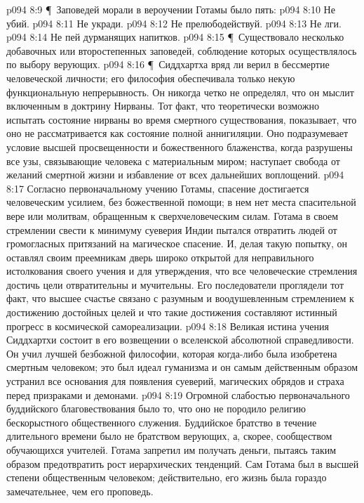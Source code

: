 \vs p094 8:9 \P\ Заповедей морали в вероучении Готамы было пять:
\vs p094 8:10 \bibnobreakspace Не убий.
\vs p094 8:11 \bibnobreakspace Не укради.
\vs p094 8:12 \bibnobreakspace Не прелюбодействуй.
\vs p094 8:13 \bibnobreakspace Не лги.
\vs p094 8:14 \bibnobreakspace Не пей дурманящих напитков.
\vs p094 8:15 \P\ Существовало несколько добавочных или второстепенных заповедей, соблюдение которых осуществлялось по выбору верующих.
\vs p094 8:16 \P\ Сиддхартха вряд ли верил в бессмертие человеческой личности; его философия обеспечивала только некую функциональную непрерывность. Он никогда четко не определял, что он мыслит включенным в доктрину Нирваны. Тот факт, что теоретически возможно испытать состояние нирваны во время смертного существования, показывает, что оно не рассматривается как состояние полной аннигиляции. Оно подразумевает условие высшей просвещенности и божественного блаженства, когда разрушены все узы, связывающие человека с материальным миром; наступает свобода от желаний смертной жизни и избавление от всех дальнейших воплощений.
\vs p094 8:17 Согласно первоначальному учению Готамы, спасение достигается человеческим усилием, без божественной помощи; в нем нет места спасительной вере или молитвам, обращенным к сверхчеловеческим силам. Готама в своем стремлении свести к минимуму суеверия Индии пытался отвратить людей от громогласных притязаний на магическое спасение. И, делая такую попытку, он оставлял своим преемникам дверь широко открытой для неправильного истолкования своего учения и для утверждения, что все человеческие стремления достичь цели отвратительны и мучительны. Его последователи проглядели тот факт, что высшее счастье связано с разумным и воодушевленным стремлением к достижению достойных целей и что такие достижения составляют истинный прогресс в космической самореализации.
\vs p094 8:18 Великая истина учения Сиддхартхи состоит в его возвещении о вселенской абсолютной справедливости. Он учил лучшей безбожной философии, которая когда\hyp{}либо была изобретена смертным человеком; это был идеал гуманизма и он самым действенным образом устранил все основания для появления суеверий, магических обрядов и страха перед призраками и демонами.
\vs p094 8:19 Огромной слабостью первоначального буддийского благовествования было то, что оно не породило религию бескорыстного общественного служения. Буддийское братство в течение длительного времени было не братством верующих, а, скорее, сообществом обучающихся учителей. Готама запретил им получать деньги, пытаясь таким образом предотвратить рост иерархических тенденций. Сам Готама был в высшей степени общественным человеком; действительно, его жизнь была гораздо замечательнее, чем его проповедь.
